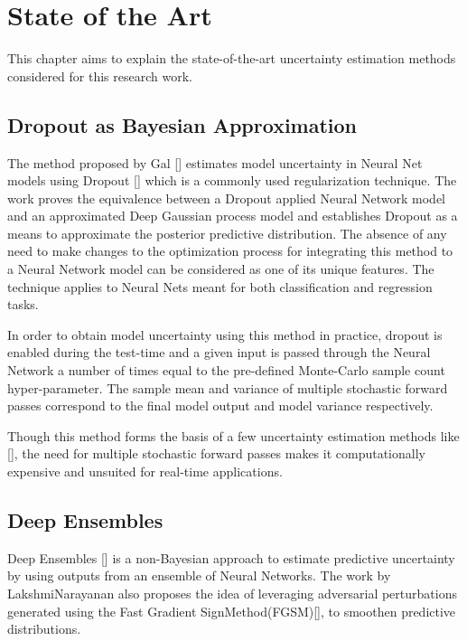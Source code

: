 

    \chapter{State of the Art}
	This chapter aims to explain the state-of-the-art uncertainty estimation methods considered for this research work. 
	\section{Dropout as Bayesian Approximation}
	The method proposed by Gal {\etal} [\cite{gal2016dropout}] estimates model uncertainty in Neural Net models using Dropout [\cite{srivastava2014dropout}] which is a commonly used regularization technique. The work proves the equivalence between a Dropout applied Neural Network model and an approximated Deep Gaussian process model and establishes Dropout as a means to approximate the posterior predictive distribution. The absence of any need to make changes to the optimization process for integrating this method to a Neural Network model can be considered as one of its unique features. The technique applies to Neural Nets meant for both classification and regression tasks. 
	
	In order to obtain model uncertainty using this method in practice, dropout is enabled during the test-time and a given input is passed through the Neural Network a number of times equal to the pre-defined Monte-Carlo sample count hyper-parameter. The sample mean and variance of multiple stochastic forward passes correspond to the final model output and model variance respectively. 
	
	Though this method forms the basis of a few uncertainty estimation methods like [\cite{loquercio2020a}], the need for multiple stochastic forward passes makes it computationally expensive and unsuited for real-time applications.
	
	\section{Deep Ensembles}
	  Deep Ensembles [\cite{lakshminarayanan2017simple}] is a non-Bayesian approach to estimate predictive uncertainty by using outputs from an ensemble of Neural Networks. The work by LakshmiNarayanan {\etal}  also proposes the idea of leveraging adversarial perturbations generated using the Fast Gradient SignMethod(FGSM)[\cite{goodfellow2015explaining}], to smoothen predictive distributions.
	  
